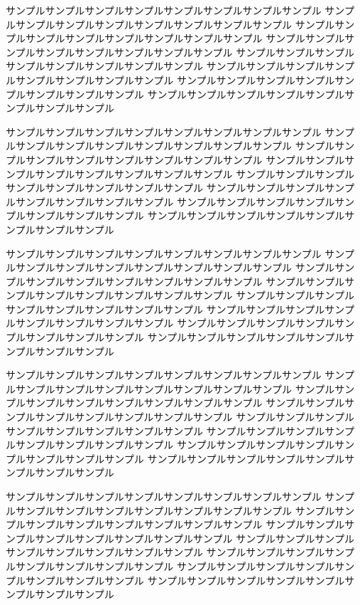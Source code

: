 

サンプルサンプルサンプルサンプルサンプルサンプルサンプルサンプル
サンプルサンプルサンプルサンプルサンプルサンプルサンプルサンプル
サンプルサンプルサンプルサンプルサンプルサンプルサンプルサンプル
サンプルサンプルサンプルサンプルサンプルサンプルサンプルサンプル
サンプルサンプルサンプルサンプルサンプルサンプルサンプルサンプル
サンプルサンプルサンプルサンプルサンプルサンプルサンプルサンプル
サンプルサンプルサンプルサンプルサンプルサンプルサンプルサンプル
サンプルサンプルサンプルサンプルサンプルサンプルサンプルサンプル


サンプルサンプルサンプルサンプルサンプルサンプルサンプルサンプル
サンプルサンプルサンプルサンプルサンプルサンプルサンプルサンプル
サンプルサンプルサンプルサンプルサンプルサンプルサンプルサンプル
サンプルサンプルサンプルサンプルサンプルサンプルサンプルサンプル
サンプルサンプルサンプルサンプルサンプルサンプルサンプルサンプル
サンプルサンプルサンプルサンプルサンプルサンプルサンプルサンプル
サンプルサンプルサンプルサンプルサンプルサンプルサンプルサンプル
サンプルサンプルサンプルサンプルサンプルサンプルサンプルサンプル


サンプルサンプルサンプルサンプルサンプルサンプルサンプルサンプル
サンプルサンプルサンプルサンプルサンプルサンプルサンプルサンプル
サンプルサンプルサンプルサンプルサンプルサンプルサンプルサンプル
サンプルサンプルサンプルサンプルサンプルサンプルサンプルサンプル
サンプルサンプルサンプルサンプルサンプルサンプルサンプルサンプル
サンプルサンプルサンプルサンプルサンプルサンプルサンプルサンプル
サンプルサンプルサンプルサンプルサンプルサンプルサンプルサンプル
サンプルサンプルサンプルサンプルサンプルサンプルサンプルサンプル


サンプルサンプルサンプルサンプルサンプルサンプルサンプルサンプル
サンプルサンプルサンプルサンプルサンプルサンプルサンプルサンプル
サンプルサンプルサンプルサンプルサンプルサンプルサンプルサンプル
サンプルサンプルサンプルサンプルサンプルサンプルサンプルサンプル
サンプルサンプルサンプルサンプルサンプルサンプルサンプルサンプル
サンプルサンプルサンプルサンプルサンプルサンプルサンプルサンプル
サンプルサンプルサンプルサンプルサンプルサンプルサンプルサンプル
サンプルサンプルサンプルサンプルサンプルサンプルサンプルサンプル

サンプルサンプルサンプルサンプルサンプルサンプルサンプルサンプル
サンプルサンプルサンプルサンプルサンプルサンプルサンプルサンプル
サンプルサンプルサンプルサンプルサンプルサンプルサンプルサンプル
サンプルサンプルサンプルサンプルサンプルサンプルサンプルサンプル
サンプルサンプルサンプルサンプルサンプルサンプルサンプルサンプル
サンプルサンプルサンプルサンプルサンプルサンプルサンプルサンプル
サンプルサンプルサンプルサンプルサンプルサンプルサンプルサンプル
サンプルサンプルサンプルサンプルサンプルサンプルサンプルサンプル


